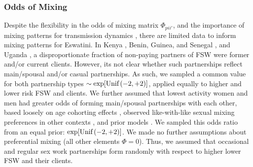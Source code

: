 \subsubsection{Odds of Mixing}\label{mod.par.mix.odds}
Despite the flexibility in the odds of mixing matrix $\Phi_{pii'}$,
and the importance of mixing patterns for transmission dynamics \cite{Garnett1993hiv},
there are limited data to inform mixing patterns for Eswatini.
In Kenya \cite{Voeten2007}, Benin, Guinea, and Senegal \cite{Godin2008}, and Uganda \cite{Mbonye2022},
a disproportionate fraction of non-paying partners of FSW were former and/or current clients.
However, its not clear whether such partnerships reflect main/spousal and/or casual partnerships.
As such, we sampled a common value for both partnership types
$\sim \exp[\textnormal{Unif}\,(-2,+2)]$,
applied equally to higher and lower risk FSW and clients.
We further assumed that lowest activity women and men had
greater odds of forming main/spousal partnerships with each other,
based loosely on age cohorting effects \cite{Leclerc-Madlala2008},
observed like-with-like sexual mixing preferences in other contexts
\cite{Morris1991ll,Garnett1993gon,Admiraal2016},
and prior models \cite{Knight2022sr}.
We sampled this odds ratio from an equal prior: $\exp[\textnormal{Unif}\,(-2,+2)]$.
We made no further assumptions about preferential mixing (\ie all other elements $\Phi = 0$).
Thus, we assumed that occasional and regular sex work partnerships form
randomly with respect to higher \vs lower FSW and their clients.
